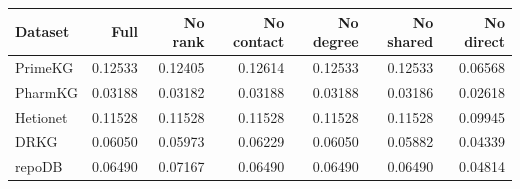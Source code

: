 \begin{tabular}{lrrrrrr}
\toprule
Dataset & Full & No rank & No contact & No degree & No shared & No direct \\
\midrule
PrimeKG & 0.12533 & 0.12405 & 0.12614 & 0.12533 & 0.12533 & 0.06568 \\
PharmKG & 0.03188 & 0.03182 & 0.03188 & 0.03188 & 0.03186 & 0.02618 \\
Hetionet & 0.11528 & 0.11528 & 0.11528 & 0.11528 & 0.11528 & 0.09945 \\
DRKG & 0.06050 & 0.05973 & 0.06229 & 0.06050 & 0.05882 & 0.04339 \\
repoDB & 0.06490 & 0.07167 & 0.06490 & 0.06490 & 0.06490 & 0.04814 \\
\bottomrule
\end{tabular}
